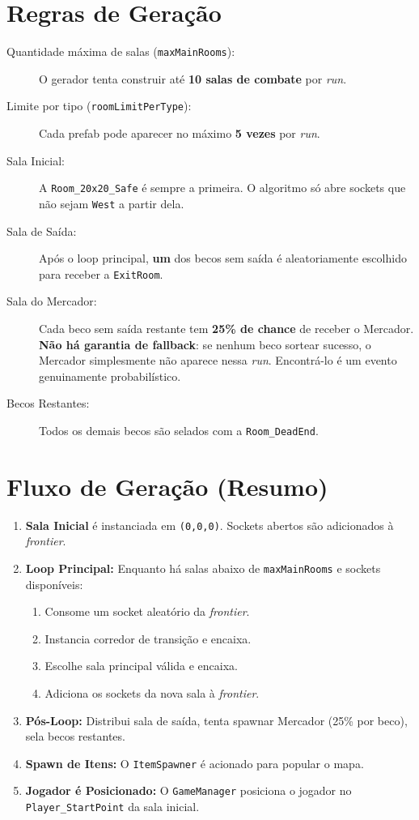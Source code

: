 \documentclass[a4paper,12pt]{report}
\begin{document}
\section{Regras de Geração}\label{sec:regras_geracao}
\begin{description}
    \item[Quantidade máxima de salas (\texttt{maxMainRooms}):] O gerador tenta construir até \textbf{10 salas de combate} por \textit{run}.
    \item[Limite por tipo (\texttt{roomLimitPerType}):] Cada prefab pode aparecer no máximo \textbf{5 vezes} por \textit{run}.
    \item[Sala Inicial:] A \texttt{Room\_20x20\_Safe} é sempre a primeira. O algoritmo só abre sockets que não sejam \texttt{West} a partir dela.
    \item[Sala de Saída:] Após o loop principal, \textbf{um} dos becos sem saída é aleatoriamente escolhido para receber a \texttt{ExitRoom}.
    \item[Sala do Mercador:] Cada beco sem saída restante tem \textbf{25\% de chance} de receber o Mercador. \textbf{Não há garantia de fallback}: se nenhum beco sortear sucesso, o Mercador simplesmente não aparece nessa \textit{run}. Encontrá-lo é um evento genuinamente probabilístico.
    \item[Becos Restantes:] Todos os demais becos são selados com a \texttt{Room\_DeadEnd}.
\end{description}

\section{Fluxo de Geração (Resumo)}
\begin{enumerate}
    \item \textbf{Sala Inicial} é instanciada em \texttt{(0,0,0)}. Sockets abertos são adicionados à \textit{frontier}.
    \item \textbf{Loop Principal:} Enquanto há salas abaixo de \texttt{maxMainRooms} e sockets disponíveis:
    \begin{enumerate}
        \item Consome um socket aleatório da \textit{frontier}.
        \item Instancia corredor de transição e encaixa.
        \item Escolhe sala principal válida e encaixa.
        \item Adiciona os sockets da nova sala à \textit{frontier}.
    \end{enumerate}
    \item \textbf{Pós-Loop:} Distribui sala de saída, tenta spawnar Mercador (25\% por beco), sela becos restantes.
    \item \textbf{Spawn de Itens:} O \texttt{ItemSpawner} é acionado para popular o mapa.
    \item \textbf{Jogador é Posicionado:} O \texttt{GameManager} posiciona o jogador no \texttt{Player\_StartPoint} da sala inicial.
\end{enumerate}
\end{document}
